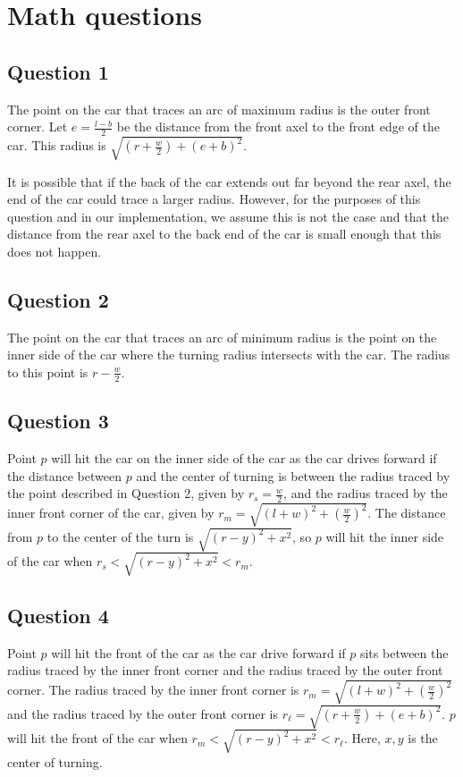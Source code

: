 \section{Math questions}

\subsection*{Question 1}
The point on the car that traces an arc of maximum radius is the outer front corner.  Let $e = \frac{l - b}{2}$ be the distance from the front axel to the front edge of the car. This radius is $\sqrt{(r + \frac{w}{2}) + (e + b)^2}$.

It is possible that if the back of the car extends out far beyond the rear axel, the end of the car could trace a larger radius. However, for the purposes of this question and in our implementation, we assume this is not the case and that the distance from the rear axel to the back end of the car is small enough that this does not happen.

\subsection*{Question 2}

The point on the car that traces an arc of minimum radius is the point on the inner side of the car where the turning radius intersects with the car. The radius to this point is $r - \frac{w}{2}$.

\subsection*{Question 3}
Point $p$ will hit the car on the inner side of the car as the car drives forward if the distance between $p$ and the center of turning is between the radius traced by the point described in Question 2, given by $r_s = \frac{w}{2}$, and the radius traced by the inner front corner of the car, given by $r_m = \sqrt{(l + w)^2 + (\frac{w}{2})^2}$. The distance from $p$ to the center of the turn is $\sqrt{(r - y)^2 + x^2}$, so $p$ will hit the inner side of the car when $r_s < \sqrt{(r - y)^2 + x^2} < r_m$.

\subsection*{Question 4}
Point $p$ will hit the front of the car as the car drive forward if $p$ sits between the radius traced by the inner front corner and the radius traced by the outer front corner. The radius traced by the inner front corner is $r_m = \sqrt{(l + w)^2 + (\frac{w}{2})^2}$ and the radius traced by the outer front corner is $r_\ell = \sqrt{(r + \frac{w}{2}) + (e + b)^2}$. $p$ will hit the front of the car when $r_m <  \sqrt{(r - y)^2 + x^2} < r_\ell$. Here, $x, y$ is the center of turning. 

